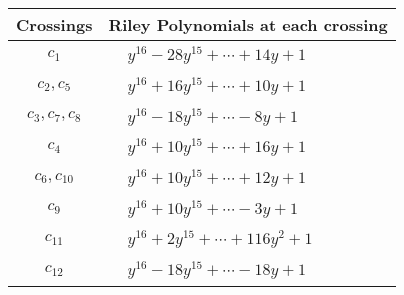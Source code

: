 \documentclass[1p]{elsarticle_modified}
\theoremstyle{definition}
\begin{document}
\begin{tabular}{m{50pt}|m{274pt}}
Crossings & \hspace{64pt}Riley Polynomials at each crossing \\
\hline $$\begin{aligned}c_{1}\end{aligned}$$&$\begin{aligned}
&y^{16}-28 y^{15}+\cdots+14 y+1
\end{aligned}$\\
\hline $$\begin{aligned}c_{2},c_{5}\end{aligned}$$&$\begin{aligned}
&y^{16}+16 y^{15}+\cdots+10 y+1
\end{aligned}$\\
\hline $$\begin{aligned}c_{3},c_{7},c_{8}\end{aligned}$$&$\begin{aligned}
&y^{16}-18 y^{15}+\cdots-8 y+1
\end{aligned}$\\
\hline $$\begin{aligned}c_{4}\end{aligned}$$&$\begin{aligned}
&y^{16}+10 y^{15}+\cdots+16 y+1
\end{aligned}$\\
\hline $$\begin{aligned}c_{6},c_{10}\end{aligned}$$&$\begin{aligned}
&y^{16}+10 y^{15}+\cdots+12 y+1
\end{aligned}$\\
\hline $$\begin{aligned}c_{9}\end{aligned}$$&$\begin{aligned}
&y^{16}+10 y^{15}+\cdots-3 y+1
\end{aligned}$\\
\hline $$\begin{aligned}c_{11}\end{aligned}$$&$\begin{aligned}
&y^{16}+2 y^{15}+\cdots+116 y^2+1
\end{aligned}$\\
\hline $$\begin{aligned}c_{12}\end{aligned}$$&$\begin{aligned}
&y^{16}-18 y^{15}+\cdots-18 y+1
\end{aligned}$\\
\hline
\end{tabular}\\~\\
\end{document}
